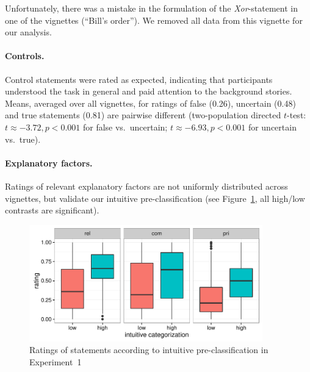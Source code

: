 \documentclass[12pt]{article}
\begin{document}
Unfortunately, there was a mistake in the formulation of the \emph{Xor}-statement in one of the
vignettes (``Bill's order''). We removed all data from this vignette for our analysis.

\paragraph{Controls.} Control statements were rated as expected, indicating that participants
understood the task in general and paid attention to the background stories. Means, averaged
over all vignettes, for ratings of false (0.26), uncertain (0.48) and true statements (0.81)
are pairwise different (two-population directed $t$-test: $t \approx - 3.72, p < 0.001$ for
false vs.~uncertain; $t \approx - 6.93, p < 0.001$ for uncertain vs.~true).



  

\paragraph{Explanatory factors.} Ratings of relevant explanatory factors are not uniformly
distributed across vignettes, but validate our intuitive pre-classification (see
Figure~\ref{fig:factorBoxPlots}, all high/low contrasts are significant).

\begin{figure}[t]
  \centering

  \includegraphics[width = 0.9\textwidth]{pics/factorBoxPlotExp1.pdf}
  
  \caption{Ratings of statements according to intuitive pre-classification in Experiment~1}
  \label{fig:factorBoxPlots}
\end{figure}
\end{document}
